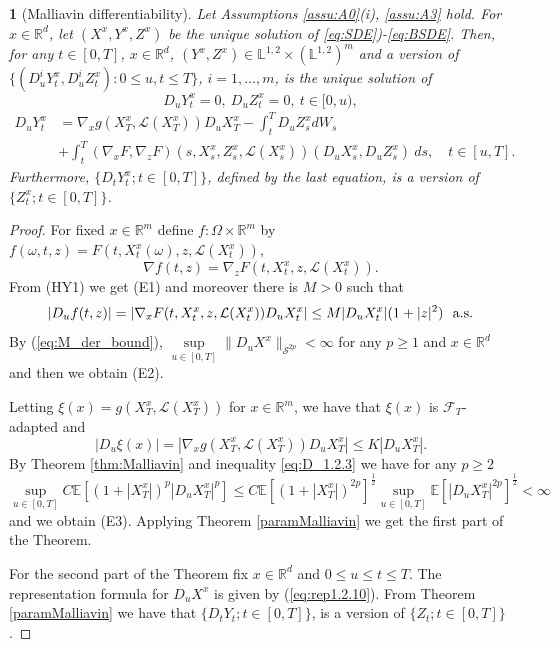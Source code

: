 \documentclass[12,english]{amsart}
\theoremstyle{plain}
\newtheorem{thm}{\protect\theoremname}
\theoremstyle{definition}
\theoremstyle{plain}
\theoremstyle{plain}
\theoremstyle{remark}
\providecommand{\theoremname}{Theorem}
\newcommand{\E}{\mathbb E}
\newcommand{\R}{\mathbb R}
\newcommand{\cF}{\mathcal F}
\newcommand{\cL}{\mathcal L}
\newcommand{\cS}{\mathcal S}
\newcommand{\om}{\omega}
\newcommand{\Om}{\Omega}
\newcommand{\si}{\sigma}
\newcommand{\mL}{\mathbb L}
\begin{document}
\begin{thm}[Malliavin differentiability]\label{mainMalliavin}
  Let %
  Assumptions \ref{assu:A0}(i), \ref{assu:A3} hold.
  For $x\in\R^d$, let $(X^x,Y^x,Z^x)$ be
 the unique solution of \eqref{eq:SDE})-\eqref{eq:BSDE}. Then, for
 any $t\in\left[0,T\right]$, $x\in\R^d$, $(Y^x,Z^x)\in\mL^{1,2}\times(\mL^{1,2})^m$
and a version of $\{(D_u^iY_t^x,D_u^iZ_t^x) :0\leq u,t\le T\}$, $i=1,\ldots,m$,
is the unique solution of 
\[
D_uY_t^x=0,~D_uZ_t^x=0,~t\in[0,u),
\]
\begin{align}\nonumber
D_uY_t^x&=  \nabla_xg(X^x_T,\cL(X^x_T)) D_uX_T^x-\int_t^TD_uZ_s^xdW_s\\
 & +\int_t^T(\nabla_x F, \nabla_z F)(s, X_s^x,Z_s^x,\cL(X_s^x))(D_uX_s^x,D_uZ_s^x)\
   ds,\quad t\in[u,T]. \label{DYBSDE}
\end{align}
Furthermore, $\{ D_tY_t^x;t\in[0,T]\} $,
defined by the last equation, is a version of $\{ Z_t^x;t\in[0,T]\} $.
\end{thm}

\begin{proof}For fixed $x\in\R^m$ define $f:\Om\times\R^m$ by
  $f(\om,t,z)=F(t,X_t^x(\om),z,\cL(X_t^x))$,
  \[\nabla f(t,z)=\nabla_zF (t,X_t^x,z,\cL(X_t^x)).\]
  From (HY1) we get (E1) and moreover there is $M>0$ such that
  \[|D_uf(t,z)|=|\nabla_xF (t,X_t^x,z,\cL(X_t^x))D_uX_t^x|\le M
    |D_uX_t^x|(1+|z|^2)\ \hbox{ a.s.}\]
By (\ref{eq:M_der_bound}), $\sup\limits_{u\in[0,T]}\|D_uX^x\|_{\cS^{2p}}<\infty$ for any
$p\ge 1$ and $x\in\R^d$ and then we obtain (E2).

Letting $\xi(x)=g(X^x_T, \cL(X^x_T))$ for $x\in\R^m$, we have that $\xi(x)$ is
$\cF_T$-adapted and 
\[|D_u\xi(x)|=|\nabla_xg(X^x_T,\cL(X^x_T))  D_uX^x_T|\le K  |D_uX^x_T|.\]
By Theorem \ref{thm:Malliavin} and inequality \eqref{eq:D_1.2.3} we
have for any $p\ge 2$ 
\[\sup_{u\in [0,T ]} C\E[(1+|X_T^x|)^p |D_uX_T^x|^p] \le
C\E[(1+|X_T^x|)^{2p}]^\frac 12\sup_{u\in [0,T ]}\E[|D_uX_T^x|^{2p}]^\frac 12<\infty\]
and we obtain (E3). Applying Theorem \ref{paramMalliavin} we get the
first part of the Theorem.

For the second part of the Theorem fix $x\in\R^d$ and $0\le u\le t\le T$.
The representation formula for $D_uX^x$ is given by
(\ref{eq:rep1.2.10}). From Theorem \ref{paramMalliavin} we have that
$\{ D_tY_t;t\in[0,T]\} $, is a version of $\{ Z_t;t\in[0,T]\} $.
\end{proof}
\end{document}
